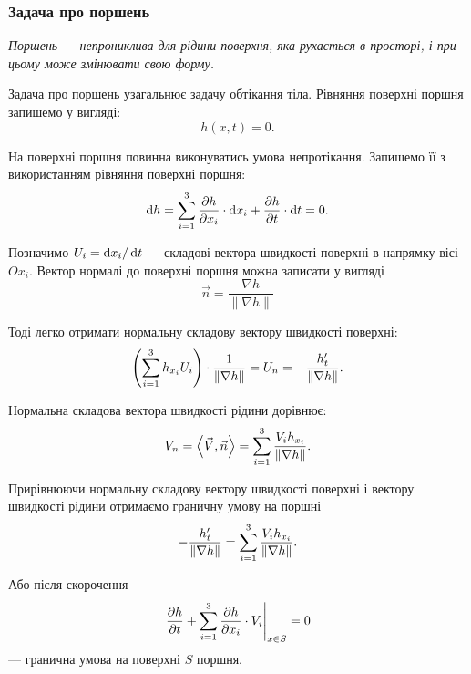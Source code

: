 \subsubsection{Задача про поршень}

\begin{definition}[поршня]
	\it{Поршень} --- непрониклива для рідини поверхня, яка рухається в просторі, і при цьому може змінювати свою форму. 
\end{definition}

Задача про поршень узагальнює задачу обтікання тіла. Рівняння поверхні поршня запишемо у вигляді:
\begin{equation}
	h(x, t) = 0.
\end{equation}

На поверхні поршня повинна виконуватись умова непротікання. Запишемо її з використанням рівняння поверхні поршня:
\begin{equation}
	\mathop{}\!\mathrm{d} h = \displaystyle\sum\limits_{i = 1}^3 \frac{\partial h}{\partial x_i} \cdot \mathop{}\!\mathrm{d} x_i + \frac{\partial h}{\partial t} \cdot \mathop{}\!\mathrm{d} t = 0.
\end{equation}

Позначимо $U_i = \mathop{}\!\mathrm{d} x_i / \mathop{}\!\mathrm{d} t$ --- складові вектора швидкості поверхні в напрямку вісі $Ox_i$. Вектор нормалі до поверхні поршня можна записати у вигляді
\begin{equation}
	\vec n = \frac{\nabla h}{\|\nabla h\|}
\end{equation}

Тоді легко отримати нормальну складову вектору швидкості поверхні:
\begin{equation}
	\left( \displaystyle\sum\limits_{i = 1}^3 h_{x_i} U_i \right) \cdot \frac{1}{\|\nabla h\|} = U_n = - \frac{h_t'}{\|\nabla h\|}.
\end{equation}

Нормальна складова вектора швидкості рідини дорівнює:
\begin{equation}
	V_n = \langle \vec V, \vec n\rangle = \Sum_{i = 1}^3 \frac{V_i h_{x_i}}{\|\nabla h\|}.
\end{equation}

Прирівнюючи нормальну складову вектору швидкості поверхні і вектору швидкості рідини отримаємо граничну умову на поршні 
\begin{equation}
	- \frac{h_t'}{\|\nabla h\|} = \displaystyle\sum\limits_{i = 1}^3 \frac{V_i h_{x_i}}{\|\nabla h\|}.
\end{equation}

Або після скорочення
\begin{equation}
	\left. \frac{\partial h}{\partial t} + \displaystyle\sum\limits_{i = 1}^3 \frac{\partial h}{\partial x_i} \cdot V_i \right|_{x \in S} = 0
\end{equation}
--- гранична умова на поверхні $S$ поршня.

